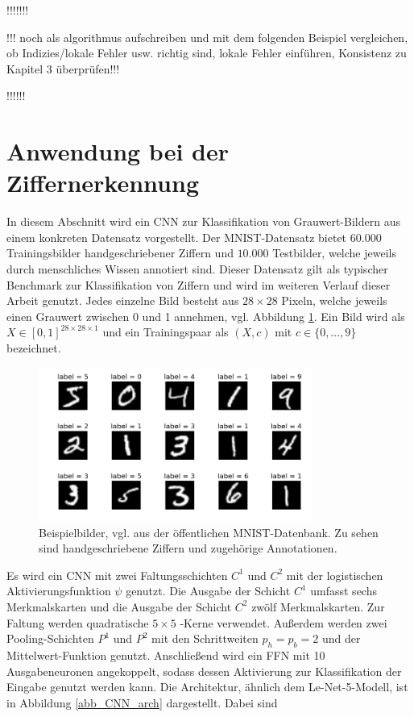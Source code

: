 !!!!!!!

!!! noch als algorithmus aufschreiben und mit dem folgenden Beispiel vergleichen, ob Indizies/lokale Fehler usw. richtig sind, lokale Fehler einführen, Konsistenz zu Kapitel 3 überprüfen!!!

!!!!!!


\section{Anwendung bei der Ziffernerkennung}
\label{abs:model_mnist}
In diesem Abschnitt wird ein CNN zur Klassifikation von Grauwert-Bildern aus einem konkreten Datensatz vorgestellt. Der MNIST-Datensatz\cite{DBLP:journals/pieee/LeCunBBH98} bietet $60.000$ Trainingsbilder handgeschriebener Ziffern und $10.000$ Testbilder, welche jeweils durch menschliches Wissen annotiert sind. Dieser Datensatz gilt als typischer Benchmark zur Klassifikation von Ziffern und wird im weiteren Verlauf dieser Arbeit genutzt. Jedes einzelne Bild besteht aus $28 \times 28$ Pixeln, welche jeweils einen Grauwert zwischen 0 und 1 annehmen, vgl. Abbildung \ref{mnistpic}. Ein Bild wird als $X \in [0,1]^{28 \times 28 \times 1}$ und ein Trainingspaar als $(X,c)$ mit $c \in \{0, \ldots, 9\}$ bezeichnet. 

\begin{figure}[h]
    \includegraphics[width=0.8\textwidth]{pics/chapters/CCN/mnist.png}
    \centering
    \caption{Beispielbilder, vgl. \cite{DBLP:journals/pieee/LeCunBBH98} aus der öffentlichen MNIST-Datenbank. Zu sehen sind handgeschriebene Ziffern und zugehörige Annotationen.}
    \label{mnistpic}
\end{figure}

Es wird ein CNN mit zwei Faltungsschichten $C^1$ und $C^2$ mit der logistischen Aktivierungsfunktion $\psi$ genutzt. Die Ausgabe der Schicht $C^1$ umfasst sechs Merkmalskarten und die Ausgabe der Schicht $C^2$ zwölf Merkmalskarten. Zur Faltung werden quadratische $5 \times 5$ -Kerne verwendet. Außerdem werden zwei Pooling-Schichten $P^1$ und $P^2$ mit den Schrittweiten $p_h=p_b=2$ und der Mittelwert-Funktion genutzt. Anschließend wird ein FFN mit 10 Ausgabeneuronen angekoppelt, sodass dessen Aktivierung zur Klassifikation der Eingabe genutzt werden kann. Die Architektur, ähnlich dem Le-Net-5-Modell\cite{DBLP:journals/pieee/LeCunBBH98}, ist in Abbildung \ref{abb_CNN_arch} dargestellt. Dabei sind

